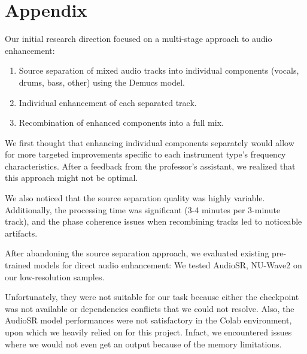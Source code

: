 \documentclass{article}
\begin{document}
\section{Appendix}

Our initial research direction focused on a multi-stage approach to audio enhancement:
\begin{enumerate}
    \item Source separation of mixed audio tracks into individual components (vocals, drums, bass, other) using the Demucs \cite{rouard2022hybrid} model.
    \item Individual enhancement of each separated track.
    \item Recombination of enhanced components into a full mix.
\end{enumerate}
We first thought that enhancing individual components separately would allow for more targeted improvements specific to each instrument type's frequency characteristics.
After a feedback from the professor's assistant, we realized that this approach might not be optimal.

We also noticed that the source separation quality was highly variable. Additionally, the processing time was significant (3-4 minutes per 3-minute track), and the phase coherence issues when recombining tracks led to noticeable artifacts.

After abandoning the source separation approach, we evaluated existing pre-trained models for direct audio enhancement:
We tested AudioSR, NU-Wave2 on our low-resolution samples.

Unfortunately, they were not suitable for our task because either the checkpoint was not available or dependencies conflicts that we could not resolve.
Also, the AudioSR model performances were not satisfactory in the Colab environment, upon which we heavily relied on for this project.
Infact, we encountered issues where we would not even get an output because of the memory limitations.
\end{document}
